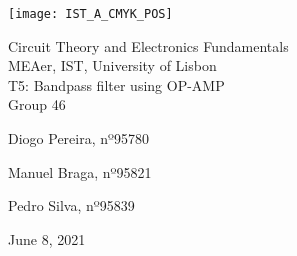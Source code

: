 
\thispagestyle {empty}

\texttt{[image: IST\_A\_CMYK\_POS]}

\begin{center}
%
\vspace{1.0cm}

\vspace{1cm}
{\FontLb Circuit Theory and Electronics Fundamentals} \\ %
\vspace{1cm}
{\FontSn MEAer, IST, University of Lisbon} \\ %
\vspace{1cm}
{\FontSn T5: Bandpass filter using OP-AMP} \\
\vspace{1cm}
{\FontSn Group 46} \\
\vspace{0.7cm}
\par{\FontSn Diogo Pereira, nº95780} \\
\par{\FontSn Manuel Braga, nº95821} \\
\par{\FontSn Pedro Silva, nº95839} \\
\vspace{1cm}
\par{\FontSn June 8, 2021} \\ %
%
\end{center}
